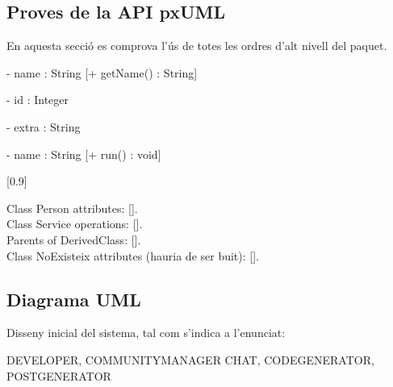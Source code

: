\documentclass{article}
\begin{document}
\subsection*{Proves de la API pxUML}

En aquesta secció es comprova l'ús de totes les ordres d'alt nivell del paquet.

{
	- name : String
}
[+ getName() : String]


{
	- id : Integer
}

{
	- extra : String
}


{
	- name : String
}
[+ run() : void]

[0.9\linewidth]

Class Person attributes: [].\\
Class Service operations: [].\\
Parents of DerivedClass: [].\\

Class NoExisteix attributes (hauria de ser buit): [].

\subsection*{Diagrama UML}
Disseny inicial del sistema, tal com s'indica a l'enunciat:

{
	DEVELOPER,
	COMMUNITYMANAGER
}
{
	CHAT,
	CODEGENERATOR,
	POSTGENERATOR
}
\end{document}
